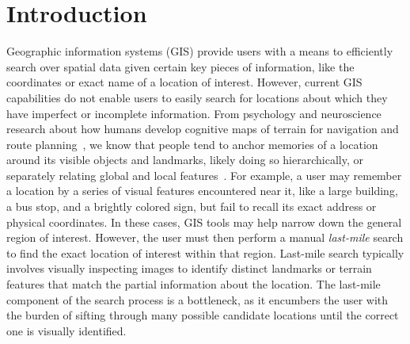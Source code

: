 \section{Introduction}
\label{section:introduction}
Geographic information systems (GIS) provide users with a means to efficiently search over spatial data given certain key pieces of information, like the coordinates or exact name of a location of interest. 
However, current GIS capabilities do not enable users to easily search for locations about which they have imperfect or incomplete information. 
From psychology and neuroscience research about how humans develop cognitive maps of terrain for navigation and route planning~\cite{Weisberg2016, Miller2013, Keatley2021}, we know that people tend to anchor memories of a location around its visible objects and landmarks, likely doing so hierarchically, or separately relating global and local features~\cite{Weisberg2016}. 
For example, a user may remember a location by a series of visual features encountered near it, like a large building, a bus stop, and a brightly colored sign, but fail to recall its exact address or physical coordinates. 
In these cases, GIS tools may help narrow down the general region of interest. However, the user must then perform a manual \emph{last-mile} search to find the exact location of interest within that region. 
Last-mile search typically involves visually inspecting images to identify distinct landmarks or terrain features that match the partial information about the location. 
The last-mile component of the search process is a bottleneck, as it encumbers the user with the burden of sifting through many possible candidate locations until the correct one is visually identified. 

